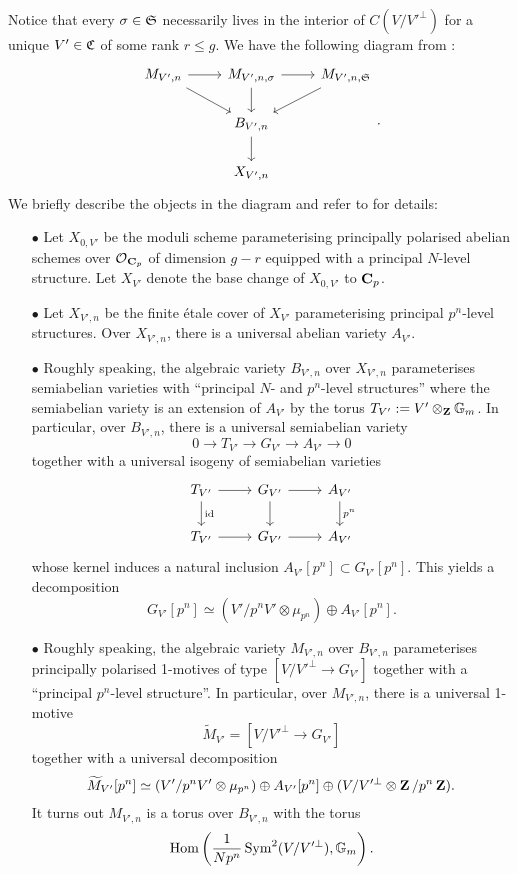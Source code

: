 Notice that every $\sigma\in \operatorname{\mathfrak{S}}$ necessarily lives in the interior of $C(V/V'^{\perp})$ for a unique $V'\in \operatorname{\mathfrak{C}}$ of some rank $r\leq g$. We have the following diagram from \cite[4.1.A]{Pilloni-Stroh-CoherentCohomologyandGaloisRepresentations}: 
$$
\begin{tikzcd}
M_{V', n}\arrow[r]\arrow[rd] & M_{V', n, \sigma}\arrow[r]\arrow[d] & M_{V', n, \frakS}\arrow[ld]\\
& B_{V', n}\arrow[d]\\ & X_{V', n}
\end{tikzcd}.
$$ 
We briefly describe the objects in the diagram and refer to \cite[Appendice A]{Pilloni-Stroh-CoherentCohomologyandGaloisRepresentations} for details:\begin{enumerate}
\item[$\bullet$] Let $X_{0,V'}$ be the moduli scheme parameterising principally polarised abelian schemes over $\operatorname{\mathcal{O}}_{\operatorname{\mathbf{C}}_p}$ of dimension $g-r$ equipped with a principal $N$-level structure. Let $X_{V'}$ denote the base change of $X_{0,V'}$ to $\operatorname{\mathbf{C}}_p$.
\item[$\bullet$] Let $X_{V', n}$ be the finite \'etale cover of $X_{V'}$ parameterising principal $p^n$-level structures. Over $X_{V', n}$, there is a universal abelian variety $A_{V'}$. 
\item[$\bullet$] Roughly speaking, the algebraic variety $B_{V', n}$ over $X_{V', n}$ parameterises semiabelian varieties with ``principal $N$- and $p^n$-level structures'' where the semiabelian variety is an extension of $A_{V'}$ by the torus $T_{V'}:=V'\otimes_{\operatorname{\mathbf{Z}}}\mathbb{G}_m$. In particular, over $B_{V', n}$, there is a universal semiabelian variety
$$0\rightarrow T_{V'}\rightarrow G_{V'}\rightarrow A_{V'}\rightarrow 0$$
together with a universal isogeny of semiabelian varieties
$$\begin{tikzcd}
T_{V'}\arrow[d, "\text{id}"] \arrow[r]& G_{V'}\arrow[d] \arrow[r] & A_{V'}\arrow[d, "p^n"]\\
T_{V'}\arrow[r] &G_{V'} \arrow[r] & A_{V'}
\end{tikzcd}$$
whose kernel induces a natural inclusion $A_{V'}[p^n]\subset G_{V'}[p^n]$. This yields a decomposition
$$G_{V'}[p^n]\simeq (V'/p^nV'\otimes\mu_{p^n})\oplus A_{V'}[p^n].$$

\item[$\bullet$] Roughly speaking, the algebraic variety $M_{V',n}$ over $B_{V', n}$ parameterises principally polarised 1-motives of type $[V/V'^{\perp}\rightarrow G_{V'}]$ together with a ``principal $p^n$-level structure''. In particular, over $M_{V',n}$, there is a universal 1-motive
$$\widetilde{M}_{V'}=[V/V'^{\perp}\rightarrow G_{V'}]$$ 
together with a universal decomposition
$$\widetilde{M}_{V'}[p^n]\simeq (V'/p^nV'\otimes\mu_{p^n})\oplus A_{V'}[p^n]\oplus (V/V'^{\perp}\otimes \operatorname{\mathbf{Z}}/p^n\operatorname{\mathbf{Z}}).$$
It turns out $M_{V', n}$ is a torus over $B_{V', n}$ with the torus $$\operatorname{Hom}\left(\frac{1}{Np^n}\operatorname{Sym}^2(V/V'^{\perp}), \operatorname{\mathbb{G}}_m\right).$$ 


\end{enumerate}
